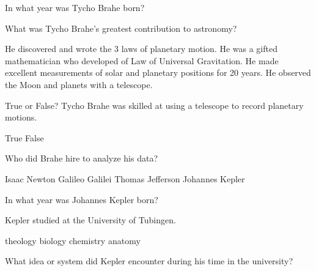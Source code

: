 \documentclass[addpoints]{exam}
\begin{document}
\begin{questions}

\question
In what year was Tycho Brahe born?

\begin{choices}
\end{choices}

\question
What was Tycho Brahe's greatest contribution to astronomy?

\begin{choices}
    \choice He discovered and wrote the 3 laws of planetary motion.
    \choice He was a gifted mathematician who developed of Law of Universal Gravitation.
    \correctchoice He made excellent measurements of solar and planetary positions for 20 years. 
    \choice He observed the Moon and planets with a telescope.
\end{choices}

\question
True or False? Tycho Brahe was skilled at using a telescope to record planetary motions.

\begin{choices}
    \choice True
    \correctchoice False
\end{choices}


\question
Who did Brahe hire to analyze his data?

\begin{choices}
    \choice Isaac Newton
    \choice Galileo Galilei
    \choice Thomas Jefferson
    \correctchoice Johannes Kepler
\end{choices}

\question
In what year was Johannes Kepler born?

\begin{choices}
\end{choices}

\question
Kepler studied \fillin[theology] at the University of Tubingen.

\begin{choices}
    \correctchoice theology 
    \choice biology
    \choice chemistry
    \choice anatomy
\end{choices}

\question
What idea or system did Kepler encounter during his time in the university?


\end{questions}
\end{document}
